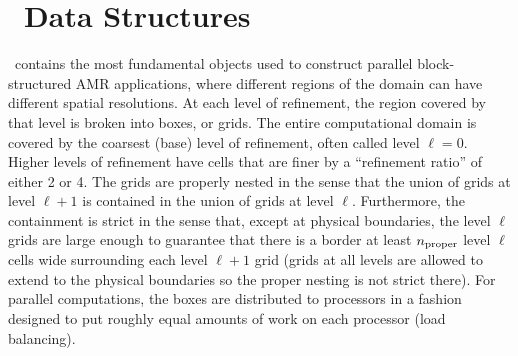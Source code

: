 \section{\BoxLib\ Data Structures}

\BoxLib\ contains the most fundamental objects used to construct parallel
block-structured AMR applications, where different regions of the domain 
can have different spatial resolutions. 
At each level of refinement, the region covered by that level is broken
into boxes, or grids.  The entire computational domain is covered by
the coarsest (base) level of refinement, often called level $\ell=0$. 
Higher levels of refinement have cells that are finer by a ``refinement ratio''
of either 2 or 4.  The grids are properly nested in the sense that the union 
of grids at level $\ell+1$ is contained in the union of grids at level $\ell$.
Furthermore, the containment is strict in the sense that, except at physical 
boundaries, the level $\ell$ grids are large enough to guarantee that there is
a border at least $n_{\rm proper}$ level $\ell$ cells wide surrounding each level
$\ell +1$ grid (grids at all levels are allowed to extend to the physical
boundaries so the proper nesting is not strict there).
For parallel computations, the boxes are distributed to processors in
a fashion designed to put roughly equal amounts of work on each
processor (load balancing).

